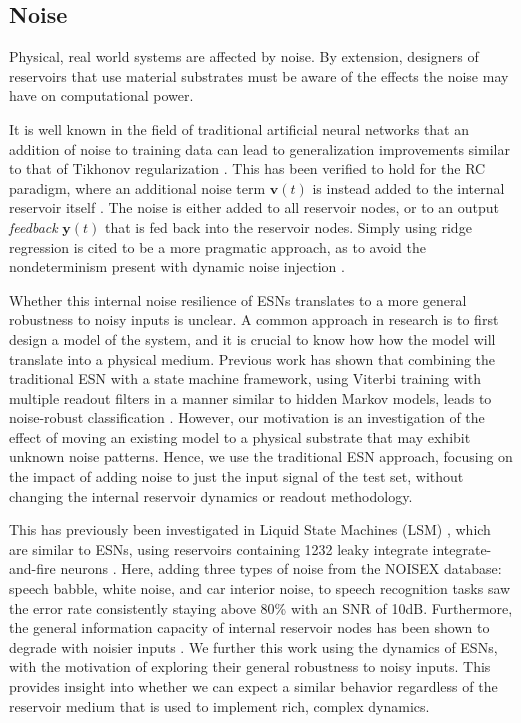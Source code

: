 \subsection{Noise}

Physical, real world systems are affected by noise. By extension, designers of
reservoirs that use material substrates must be aware of the effects the noise
may have on computational power.

It is well known in the field of traditional artificial neural networks that an
addition of noise to training data can lead to generalization improvements
similar to that of Tikhonov regularization \cite{bishop_training_1995}. This has
been verified to hold for the RC paradigm, where an additional noise term
$\mathbf{v}(t)$ is instead added to the internal reservoir itself
\cite{jaeger_echo_2001}. The noise is either added to all reservoir nodes, or to
an output \textit{feedback} $\mathbf{y}(t)$ that is fed back into the reservoir
nodes. Simply using ridge regression is cited to be a more pragmatic approach,
as to avoid the nondeterminism present with dynamic noise injection
\cite{kurkova_stable_2008}.

Whether this internal noise resilience of ESNs translates to a more general
robustness to noisy inputs is unclear. A common approach in research is to first
design a model of the system, and it is crucial to know how how the model will
translate into a physical medium. Previous work has shown that combining the
traditional ESN with a state machine framework, using Viterbi training with
multiple readout filters in a manner similar to hidden Markov models, leads to
noise-robust classification \cite{skowronski_noise-robust_2007}. However, our
motivation is an investigation of the effect of moving an existing model to a
physical substrate that may exhibit unknown noise patterns. Hence, we use the
traditional ESN approach, focusing on the impact of adding noise to just the
input signal of the test set, without changing the internal reservoir dynamics
or readout methodology.

This has previously been investigated in Liquid State Machines (LSM)
\cite{maass_real-time_2002}, which are similar to ESNs, using reservoirs
containing 1232 leaky integrate integrate-and-fire neurons
\cite{verstraeten_isolated_2005}. Here, adding three types of noise from the
NOISEX database: speech babble, white noise, and car interior noise, to speech
recognition tasks saw the error rate consistently staying above 80\% with an SNR
of 10dB. Furthermore, the general information capacity of internal reservoir
nodes has been shown to degrade with noisier inputs
\cite{dambre_information_2012}. We further this work using the dynamics of ESNs,
with the motivation of exploring their general robustness to noisy inputs. This
provides insight into whether we can expect a similar behavior regardless of the
reservoir medium that is used to implement rich, complex dynamics.

